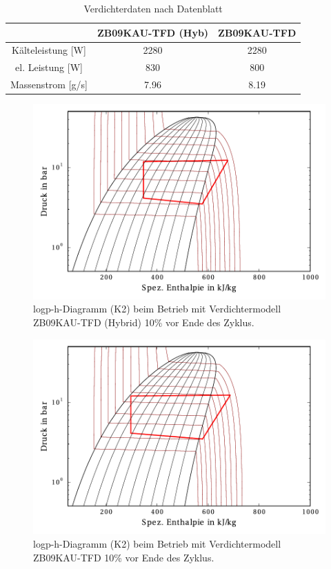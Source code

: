 \begin{table}[h!]
\centering
\caption{Verdichterdaten nach Datenblatt}
\label{tab:Verdichterdatenblatt}
\begin{tabular}{|ccc|}
\hline
                                            & ZB09KAU-TFD (Hyb)         & ZB09KAU-TFD \\ \hline
\multicolumn{1}{|c|}{Kälteleistung {[}W{]}} & \multicolumn{1}{c|}{2280} & 2280        \\
\multicolumn{1}{|c|}{el. Leistung {[}W{]}}  & \multicolumn{1}{c|}{830}  & 800         \\
\multicolumn{1}{|c|}{Massenstrom {[}g/s{]}} & \multicolumn{1}{c|}{7.96} & 8.19        \\ \hline
\end{tabular}
\end{table}


\begin{figure}[h!]
\centering
\includegraphics[scale=0.8]{Pictures/51/log_ph_lastCycle10perc_C21.pdf}
\caption{logp-h-Diagramm (K2) beim Betrieb mit Verdichtermodell ZB09KAU-TFD (Hybrid) \unit{10}{\%} vor Ende des Zyklus.}
\label{fig:logph51}
\end{figure}

\begin{figure}[h!]
\centering
\includegraphics[scale=0.8]{Pictures/54/log_ph_lastCycle10perc_C21.pdf}
\caption{logp-h-Diagramm (K2) beim Betrieb mit Verdichtermodell ZB09KAU-TFD \unit{10}{\%} vor Ende des Zyklus.}
\label{fig:logph54}
\end{figure}






